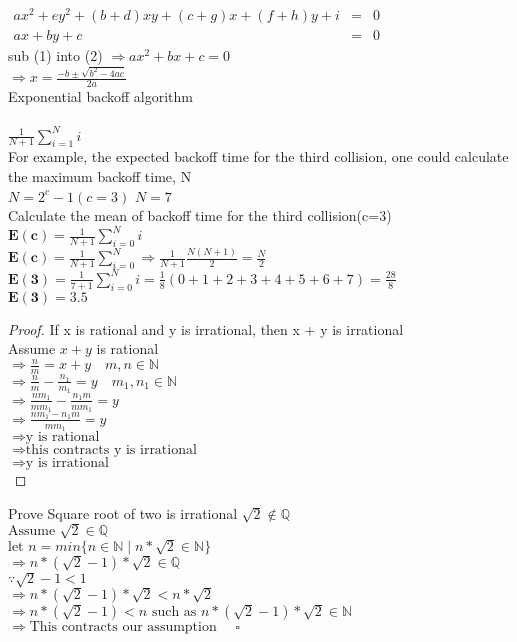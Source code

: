 \documentclass[10pt]{article}
\begin{document}
\noindent
$
\begin{array}{lcl}
ax^{2} + ey^{2} + (b+d)xy + (c+g)x + (f+h)y + i &=& 0\\
ax + by + c &=& 0
\end{array}
$\\
sub (1) into (2) 
$\Rightarrow ax^{2} + bx + c = 0$\\
$\Rightarrow x = \frac{-b \pm \sqrt{b^{2} - 4ac}}{2a}$
\\

Exponential backoff algorithm\\
\\
$\frac{1}{N+1} \sum_{i=1}^{N}i$\\
For example, the expected backoff time for the third collision, one could 
calculate the maximum backoff time, N\\
$N = 2^{c} - 1 (c = 3)$
$N = 7$\\
Calculate the mean of backoff time for the third collision(c=3)\\
$\mathbf{E(c)} = \frac{1}{N+1}\sum_{i=0}^{N} i$\\
$\mathbf{E(c)} = \frac{1}{N+1}\sum_{i=0}^{N} \Rightarrow \frac{1}{N+1} \frac{N(N+1)}{2} = \frac{N}{2}$\\
$\mathbf{E(3)} = \frac{1}{7+1}\sum_{i=0}^{N} i = \frac{1}{8}(0+1+2+3+4+5+6+7) = \frac{28}{8}$\\
$\mathbf{E(3)} = 3.5$\\

\begin{proof}
If x is rational and y is irrational, then x + y is irrational \\
Assume $x + y$ is rational \\
    $\Rightarrow \frac{n}{m} = x + y  \quad m, n \in  \mathbb{N}$ \\ 
    $\Rightarrow \frac{n}{m} - \frac{n_1}{m_1} = y \quad m_1, n_1 \in  \mathbb{N}$ \\
    $\Rightarrow \frac{n m_1}{m m_1} - \frac{n_1 m}{m m_1} = y$  \\
    $\Rightarrow \frac{n m_1 - n_1 m}{m m_1} = y$  \\
    $\Rightarrow \mbox{y is rational}$  \\
    $\Rightarrow \mbox{this contracts y is irrational}$ \\
    $\Rightarrow \mbox{y is irrational}$ \\
\end{proof}

Prove Square root of two is irrational
$\sqrt{2} \notin \mathbb{Q}$\\
$\text{Assume } \sqrt{2} \in \mathbb{Q}$\\
$\text{let }n = min\{ n \in \mathbb{N} \mid n*\sqrt{2} \in \mathbb{N}\}$\\
$\Rightarrow n*(\sqrt{2} - 1)*\sqrt{2} \in \mathbb{Q}$\\
$\because \sqrt{2} - 1 < 1$\\
$\Rightarrow n*(\sqrt{2} - 1)*\sqrt{2} < n*\sqrt{2}$\\
$\Rightarrow n*(\sqrt{2} - 1) < n \text{ such as } n*(\sqrt{2} - 1)*\sqrt{2} \in \mathbb{N}$\\
$\Rightarrow \text{This contracts our assumption } \quad \square$\\
\end{document}
